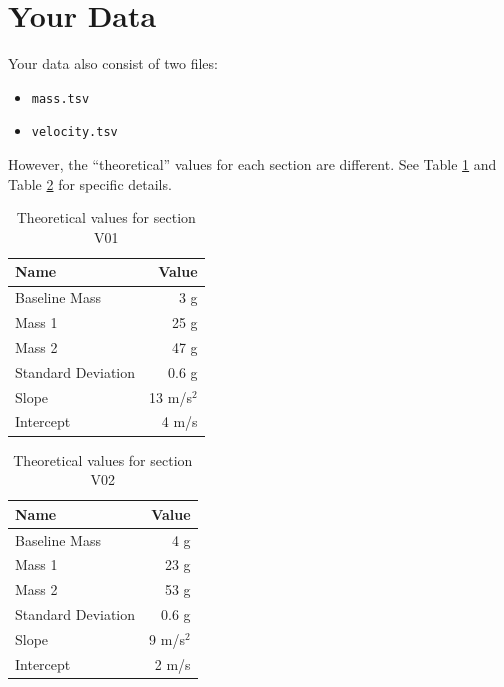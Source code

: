 \section{Your Data}
Your data also consist of two files:
\begin{itemize}
    \item \texttt{mass.tsv}
    \item \texttt{velocity.tsv}
\end{itemize}
However, the ``theoretical'' values for each section are different. See Table \ref{table.theoretical.v01} and Table \ref{table.theoretical.v02} for specific details.
\begin{table} \label{table.theoretical.v01}
    \centering
    \begin{tabular}{|l|r|}
        \hline
        \textbf{Name} & \textbf{Value} \\
        \hline
        Baseline Mass & 3 g \\
        Mass 1 & 25 g \\
        Mass 2 & 47 g \\
        Standard Deviation & 0.6 g \\
        \hline
        Slope & 13 m/s$^{2}$ \\
        Intercept & 4 m/s \\
        \hline
    \end{tabular}
    \caption{Theoretical values for section V01}
\end{table}
\begin{table} \label{table.theoretical.v02}
    \centering
    \begin{tabular}{|l|r|}
        \hline
        \textbf{Name} & \textbf{Value} \\
        \hline
        Baseline Mass & 4 g \\
        Mass 1 & 23 g \\
        Mass 2 & 53 g \\
        Standard Deviation & 0.6 g \\
        \hline
        Slope & 9 m/s$^{2}$ \\
        Intercept & 2 m/s \\
        \hline
    \end{tabular}
    \caption{Theoretical values for section V02}
\end{table}

